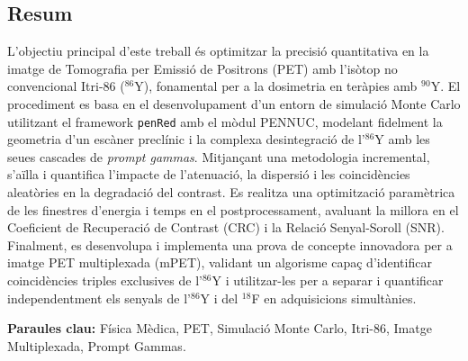 \begin{otherlanguage}{catalan}
	\chapter*{Resum}
	L'objectiu principal d'este treball és optimitzar la precisió quantitativa en la imatge de Tomografia per Emissió de Positrons (PET) amb l'isòtop no convencional Itri-86 ($^{86}$Y), fonamental per a la dosimetria en teràpies amb $^{90}$Y. El procediment es basa en el desenvolupament d'un entorn de simulació Monte Carlo utilitzant el framework \texttt{penRed} amb el mòdul PENNUC, modelant fidelment la geometria d'un escàner preclínic i la complexa desintegració de l'$^{86}$Y amb les seues cascades de \textit{prompt gammas}. Mitjançant una metodologia incremental, s'aïlla i quantifica l'impacte de l'atenuació, la dispersió i les coincidències aleatòries en la degradació del contrast. Es realitza una optimització paramètrica de les finestres d'energia i temps en el postprocessament, avaluant la millora en el Coeficient de Recuperació de Contrast (CRC) i la Relació Senyal-Soroll (SNR). Finalment, es desenvolupa i implementa una prova de concepte innovadora per a imatge PET multiplexada (mPET), validant un algorisme capaç d'identificar coincidències triples exclusives de l'$^{86}$Y i utilitzar-les per a separar i quantificar independentment els senyals de l'$^{86}$Y i del $^{18}$F en adquisicions simultànies.

	\vspace{0.5cm}
	\textbf{Paraules clau:} Física Mèdica, PET, Simulació Monte Carlo, Itri-86, Imatge Multiplexada, Prompt Gammas.
\end{otherlanguage}

\vfill

